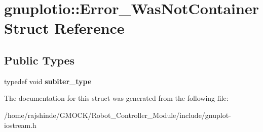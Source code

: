 \hypertarget{structgnuplotio_1_1_error___was_not_container}{}\section{gnuplotio\+:\+:Error\+\_\+\+Was\+Not\+Container Struct Reference}
\label{structgnuplotio_1_1_error___was_not_container}
\subsection*{Public Types}
\begin{DoxyCompactItemize}
\item 
typedef void {\bfseries subiter\+\_\+type}\hypertarget{structgnuplotio_1_1_error___was_not_container_aeac5de90c903be765130fc14f85dfb00}{}\label{structgnuplotio_1_1_error___was_not_container_aeac5de90c903be765130fc14f85dfb00}

\end{DoxyCompactItemize}


The documentation for this struct was generated from the following file\+:\begin{DoxyCompactItemize}
\item 
/home/rajshinde/\+G\+M\+O\+C\+K/\+Robot\+\_\+\+Controller\+\_\+\+Module/include/gnuplot-\/iostream.\+h\end{DoxyCompactItemize}
